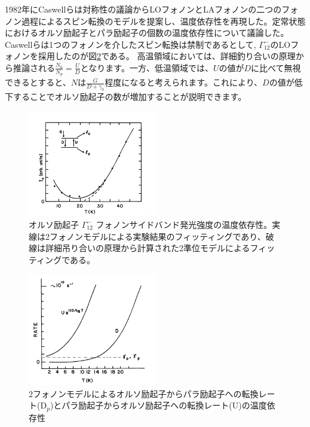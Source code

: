 1982年にCaswellらは対称性の議論からLOフォノンとLAフォノンの二つのフォノン過程によるスピン転換のモデルを提案し、温度依存性を再現した。定常状態におけるオルソ励起子とパラ励起子の個数の温度依存性について議論した。
  Caswellらは1つのフォノンを介したスピン転換は禁制であるとして,
$\Gamma_{12}^{-}$のLOフォノンを採用したのが図\ref{fig:exciton_phonon_sideband2}である。
高温領域においては、詳細釣り合いの原理から推論される$\frac{N_0}{N_p} = \frac{U}{D}$となります。一方、低温領域では、$U$の値が$D$に比べて無視できるとすると、$N$は$\frac{G}{D + \gamma_0}$程度になると考えられます。これにより、$D$の値が低下することでオルソ励起子の数が増加することが説明できます。
\begin{figure}[htbp]
\centering
\includegraphics[width=0.5\textwidth]{screenshoot_2024-08-16_21.20.00.png}
\caption{オルソ励起子 $\Gamma^{-}_{12}$ フォノンサイドバンド発光強度の温度依存性。実線は2フォノンモデルによる実験結果のフィッティングであり、破線は詳細吊り合いの原理から計算された2準位モデルによるフィッティングである。}
\label{fig:exciton_phonon_sideband}
\end{figure}
\begin{figure}[htbp]
\centering
\includegraphics[width=0.5\textwidth]{Screen_2024-08-16_21.32.29.png}
\caption{2フォノンモデルによるオルソ励起子からパラ励起子への転換レート(D$_p$)とパラ励起子からオルソ励起子への転換レート(U)の温度依存性}
\label{fig:exciton_phonon_sideband2}
\end{figure}

